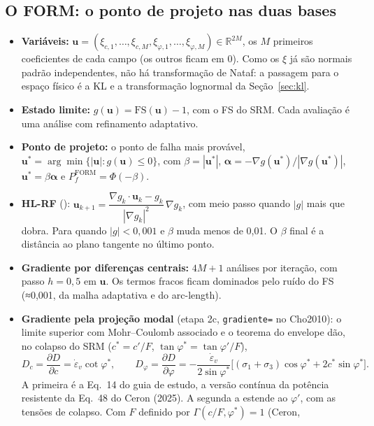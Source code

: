 \documentclass[11pt,a4paper]{article}
\begin{document}
\subsection{O FORM: o ponto de projeto nas duas bases}\label{sec:form}
\begin{itemize}
  \item \textbf{Variáveis:} $\bm u = (\xi_{c,1}, \dots, \xi_{c,M}, \xi_{\varphi,1}, \dots, \xi_{\varphi,M}) \in
    \mathbb R^{2M}$, os $M$ primeiros coeficientes de cada campo (os outros ficam em 0). Como os $\xi$ já são normais
    padrão independentes, não há transformação de Nataf: a passagem para o espaço físico é a KL e a transformação
    lognormal da Seção~\ref{sec:kl}.
  \item \textbf{Estado limite:} $g(\bm u) = \mathrm{FS}(\bm u) - 1$, com o FS do SRM. Cada avaliação é uma análise com
    refinamento adaptativo.
  \item \textbf{Ponto de projeto:} o ponto de falha mais provável, $\bm u^* = \arg\min\{|\bm u| : g(\bm u) \le 0\}$, com
    $\beta = |\bm u^*|$, $\bm\alpha = -\nabla g(\bm u^*)/|\nabla g(\bm u^*)|$, $\bm u^* = \beta\bm\alpha$ e
    $P_f^{\mathrm{FORM}} = \Phi(-\beta)$.
  \item \textbf{HL-RF} ():
    $\bm u_{k+1} = \dfrac{\nabla g_k\cdot\bm u_k - g_k}{|\nabla g_k|^2}\,\nabla g_k$, com meio passo quando $|g|$ mais
    que dobra. Para quando $|g| < 0{,}001$ e $\beta$ muda menos de 0,01. O $\beta$ final é a distância ao plano
    tangente no último ponto.
  \item \textbf{Gradiente por diferenças centrais:} $4M + 1$ análises por iteração, com passo $h = 0{,}5$ em $\bm u$. Os
    termos fracos ficam dominados pelo ruído do FS (≈0,001, da malha adaptativa e do arc-length).
  \item \textbf{Gradiente pela projeção modal} (etapa 2c, \texttt{gradiente=} no Cho2010): o limite superior com
    Mohr--Coulomb associado e o teorema do envelope dão, no colapso do SRM ($c^* = c'/F$, $\tan\varphi^* = \tan\varphi'/F$),
    \begin{equation*}
      D_c = \frac{\partial D}{\partial c} = \dot\varepsilon_v\cot\varphi^*, \qquad
      D_\varphi = \frac{\partial D}{\partial \varphi} = -\frac{\dot\varepsilon_v}{2\sin\varphi^*}\big[(\sigma_1+\sigma_3)
      \cos\varphi^* + 2c^*\sin\varphi^*\big].
    \end{equation*}
    A primeira é a Eq.~14 do guia de estudo, a versão contínua da potência resistente da Eq.~48 do Ceron (2025). A
    segunda a estende ao $\varphi'$, com as tensões de colapso. Com $F$ definido por $\Gamma(c/F, \varphi^*) = 1$ (Ceron,

\end{itemize}
\end{document}
